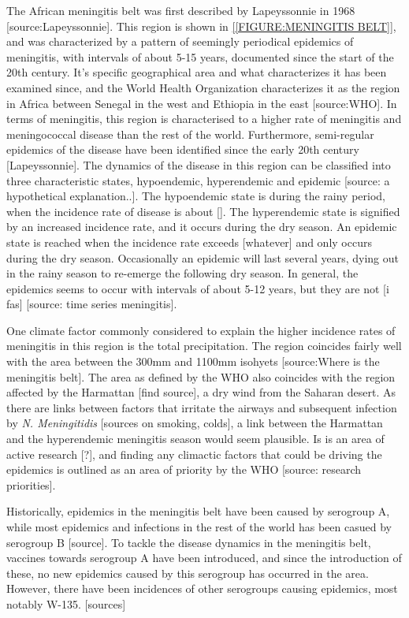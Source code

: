 \documentclass[10pt,a4paper]{article}
\begin{document}
The African meningitis belt was first described by Lapeyssonnie in 1968 [source:Lapeyssonnie]. This region is shown in \cref{[FIGURE:MENINGITIS BELT]}, and was characterized by a pattern of seemingly periodical epidemics of meningitis, with intervals of about 5-15 years, documented since the start of the 20th century. It's specific geographical area and what characterizes it has been examined since, and the World Health Organization characterizes it as the region in Africa between Senegal in the west and Ethiopia in the east [source:WHO]. In terms of meningitis, this region is characterised to a higher rate of meningitis and meningococcal disease than the rest of the world. Furthermore, semi-regular epidemics of the disease have been identified since the early 20th century [Lapeyssonnie]. The dynamics of the disease in this region can be classified into three characteristic states, hypoendemic, hyperendemic and epidemic [source: a hypothetical explanation..]. The hypoendemic state is during the rainy period, when the incidence rate of disease is about []. The hyperendemic state is signified by an increased incidence rate, and it occurs during the dry season. An epidemic state is reached when the incidence rate exceeds [whatever] and only occurs during the dry season. Occasionally an epidemic will last several years, dying out in the rainy season to re-emerge the following dry season. In general, the epidemics seems to occur with intervals of about 5-12 years, but they are not [i fas] [source: time series meningitis].

One climate factor commonly considered to explain the higher incidence rates of meningitis in this region is the total precipitation. The region coincides fairly well with the area between the 300mm and 1100mm isohyets [source:Where is the meningitis belt]. The area as defined by the WHO also coincides with the region affected by the Harmattan [find source], a dry wind from the Saharan desert. As there are links between factors that irritate the airways and subsequent infection by \emph{N. Meningitidis} [sources on smoking, colds], a link between the Harmattan and the hyperendemic meningitis season would seem plausible. Is is an area of active research [?], and finding any climactic factors that could be driving the epidemics is outlined as an area of priority by the WHO [source: research priorities].

Historically, epidemics in the meningitis belt have been caused by serogroup A, while most epidemics and infections in the rest of the world has been casued by serogroup B [source]. To tackle the disease dynamics in the meningitis belt, vaccines towards serogroup A have been introduced, and since the introduction of these, no new epidemics caused by this serogroup has occurred in the area. However, there have been incidences of other serogroups causing epidemics, most notably W-135. [sources]
\end{document}
